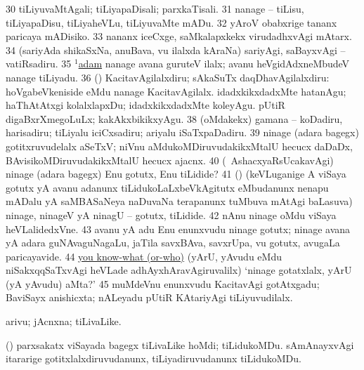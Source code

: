 \num{30}  tiLiyuvaMtAgali; tiLiyapaDisali; parxkaTisali. 
\num{31}  nanage -- tiLisu, tiLiyapaDisu, tiLiyaheVLu, tiLiyuvaMte mADu. 
\num{32}  yAroV obabxrige tananx paricaya mADisiko. 
\num{33}  nananx iceCxge, saMkalapxkekx virudadhxvAgi mAtarx. 
\num{34}  (sariyAda shikaSxNa, anuBava, \mo vu ilalxda kAraNa) sariyAgi, saBayxvAgi -- vatiRsadiru. 
\num{35}  \hyperref{kandict_a.pdf}{A}{adam(1) nuga(1)}{$^1$adam} nanage avana guruteV ilalx; avanu heVgidAdxneMbudeV nanage tiLiyadu. 
\num{36}  (\AmA) KacitavAgilalxdiru; sAkaSuTx daqDhavAgilalxdiru:  hoVgabeVkeniside eMdu nanage KacitavAgilalx. 
  
\banum
{} idadxkikxdadxMte hatanAgu; haThAtAtxgi kolalxlapxDu; idadxkikxdadxMte koleyAgu. 
 pUtiR digaBxrXmegoLuLx; kakAkxbikikxyAgu. 
\eanum
\numie
\num{38}  (oMdakekx) gamana -- koDadiru, harisadiru; tiLiyalu iciCxsadiru; ariyalu iSaTxpaDadiru. 
\num{39}  ninage (adara bagegx) gotitxruvudelalx aSeTxV; niVnu aMdukoMDiruvudakikxMtalU hecucx daDaDx, BAvisikoMDiruvudakikxMtalU hecucx ajacnx. 
\num{40}  (\AmA\ AshacxyaRsUcakavAgi) ninage (adara bagegx) Enu gotutx, Enu tiLidide? 
\num{41}  (\AmA) (keVLuganige A viSaya gotutx yA avanu adanunx tiLidukoLaLxbeVkAgitutx eMbudanunx nenapu mADalu yA saMBASaNeya naDuvaNa terapanunx tuMbuva mAtAgi baLasuva) ninage, ninageV yA ninagU -- gotutx, tiLidide. 
\num{42}   nAnu ninage oMdu viSaya heVLalidedxVne. 
\num{43}    avanu yA adu Enu enunxvudu ninage gotutx; ninage avana yA adara guNAvaguNagaLu, jaTila savxBAva, savxrUpa, \mo vu gotutx, avugaLa paricayavide. 
\num{44} \hyperref{kandict_y.pdf}{Y}{you pagu(3)}{you know-what (or-who)} (yArU, yAvudu eMdu niSakxqqSaTxvAgi heVLade adhAyxhAravAgiruvalilx) `ninage gotatxlalx, yArU (yA yAvudu) aMta?' 
\num{45}  muMdeVnu enunxvudu KacitavAgi gotAtxgadu; BaviSayx anishicxta; nALeyadu pUtiR KAtariyAgi tiLiyuvudilalx. 
\enum
\emng
\eentry

\bentry
{}
\gl{\nA}
\bmng
arivu; jAcnxna; tiLivaLike. 
\emng

\noindent
\gl{\nuga}
\bmng
{} (\AmA) parxsakatx viSayada bagegx 
\banum
{} tiLivaLike hoMdi; tiLidukoMDu. 
 sAmAnayxvAgi itararige gotitxlalxdiruvudanunx, tiLiyadiruvudanunx tiLidukoMDu. 
\eanum
\emng
\eentry

